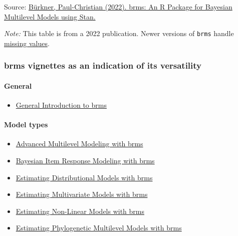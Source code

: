 \documentclass[
  11pt,
]{article}
\providecommand{\tightlist}{%
  \setlength{\itemsep}{0pt}\setlength{\parskip}{0pt}}
\begin{document}
Source: \href{https://cloud.r-project.org/web/packages/brms/vignettes/brms_overview.pdf}{Bürkner, Paul-Christian (2022). brms: An R Package for Bayesian Multilevel Models
using Stan.}

\emph{Note:} This table is from a 2022 publication. Newer versions of \texttt{brms} handle \href{https://cloud.r-project.org/web/packages/brms/vignettes/brms_missings.html}{missing values}.

\hypertarget{brms-vignettes-as-an-indication-of-its-versatility}{%
\subsubsection{brms vignettes as an indication of its versatility}\label{brms-vignettes-as-an-indication-of-its-versatility}}

\hypertarget{general}{%
\paragraph{General}\label{general}}

\begin{itemize}
\tightlist
\item
  \href{https://www.jstatsoft.org/article/view/v080i01}{General Introduction to brms}
\end{itemize}

\hypertarget{model-types}{%
\paragraph{Model types}\label{model-types}}

\begin{itemize}
\tightlist
\item
  \href{https://journal.r-project.org/archive/2018/RJ-2018-017/index.html}{Advanced Multilevel Modeling with brms}
\item
  \href{https://arxiv.org/abs/1905.09501}{Bayesian Item Response Modeling with brms}
\item
  \href{https://paul-buerkner.github.io/brms/articles/brms_distreg.html}{Estimating Distributional Models with brms}
\item
  \href{https://paul-buerkner.github.io/brms/articles/brms_multivariate.html}{Estimating Multivariate Models with brms}
\item
  \href{https://paul-buerkner.github.io/brms/articles/brms_nonlinear.html}{Estimating Non-Linear Models with brms}
\item
  \href{https://paul-buerkner.github.io/brms/articles/brms_phylogenetics.html}{Estimating Phylogenetic Multilevel Models with brms}
\end{itemize}
\end{document}
